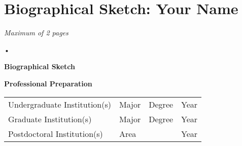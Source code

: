 
\section{Biographical Sketch: Your Name}
\begin{center}
\emph{Maximum of 2 pages}
\end{center}•





\setcounter{page}{1}
\renewcommand{\thepage}{Biographical Sketch - Page \arabic{page} of 2}
\begin{center}
\textbf{\large Biographical Sketch}
\end{center}

{\bf Professional Preparation}

\begin{tabular}{llll}
Undergraduate Institution(s) \hspace{0.5in} & Major \hspace{1in} & Degree  \hspace{0.25in} & Year \\
Graduate Institution(s)                     & Major              & Degree                  & Year \\
Postdoctoral Institution(s)                 & Area               &                         & Year
\end{tabular}




